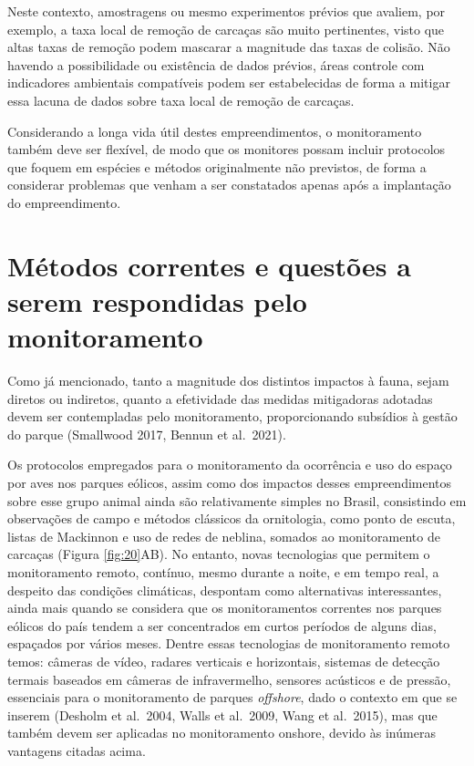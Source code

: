 \documentclass[
  oneside]{scrbook}
\begin{document}
Neste contexto, amostragens ou mesmo experimentos prévios que avaliem, por exemplo, a taxa local de remoção de carcaças são muito pertinentes, visto que altas taxas de remoção podem mascarar a magnitude das taxas de colisão. Não havendo a possibilidade ou existência de dados prévios, áreas controle com indicadores ambientais compatíveis podem ser estabelecidas de forma a mitigar essa lacuna de dados sobre taxa local de remoção de carcaças.

Considerando a longa vida útil destes empreendimentos, o monitoramento também deve ser flexível, de modo que os monitores possam incluir protocolos que foquem em espécies e métodos originalmente não previstos, de forma a considerar problemas que venham a ser constatados apenas após a implantação do empreendimento.

\hypertarget{muxe9todos-correntes-e-questuxf5es-a-serem-respondidas-pelo-monitoramento}{%
\section{Métodos correntes e questões a serem respondidas pelo monitoramento}\label{muxe9todos-correntes-e-questuxf5es-a-serem-respondidas-pelo-monitoramento}}

Como já mencionado, tanto a magnitude dos distintos impactos à fauna, sejam diretos ou indiretos, quanto a efetividade das medidas mitigadoras adotadas devem ser contempladas pelo monitoramento, proporcionando subsídios à gestão do parque (Smallwood 2017, Bennun et al.~2021).

Os protocolos empregados para o monitoramento da ocorrência e uso do espaço por aves nos parques eólicos, assim como dos impactos desses empreendimentos sobre esse grupo animal ainda são relativamente simples no Brasil, consistindo em observações de campo e métodos clássicos da ornitologia, como ponto de escuta, listas de Mackinnon e uso de redes de neblina, somados ao monitoramento de carcaças (Figura \ref{fig:20}AB). No entanto, novas tecnologias que permitem o monitoramento remoto, contínuo, mesmo durante a noite, e em tempo real, a despeito das condições climáticas, despontam como alternativas interessantes, ainda mais quando se considera que os monitoramentos correntes nos parques eólicos do país tendem a ser concentrados em curtos períodos de alguns dias, espaçados por vários meses. Dentre essas tecnologias de monitoramento remoto temos: câmeras de vídeo, radares verticais e horizontais, sistemas de detecção termais baseados em câmeras de infravermelho, sensores acústicos e de pressão, essenciais para o monitoramento de parques \emph{offshore}, dado o contexto em que se inserem (Desholm et al.~2004, Walls et al.~2009, Wang et al.~2015), mas que também devem ser aplicadas no monitoramento onshore, devido às inúmeras vantagens citadas acima.
\end{document}
